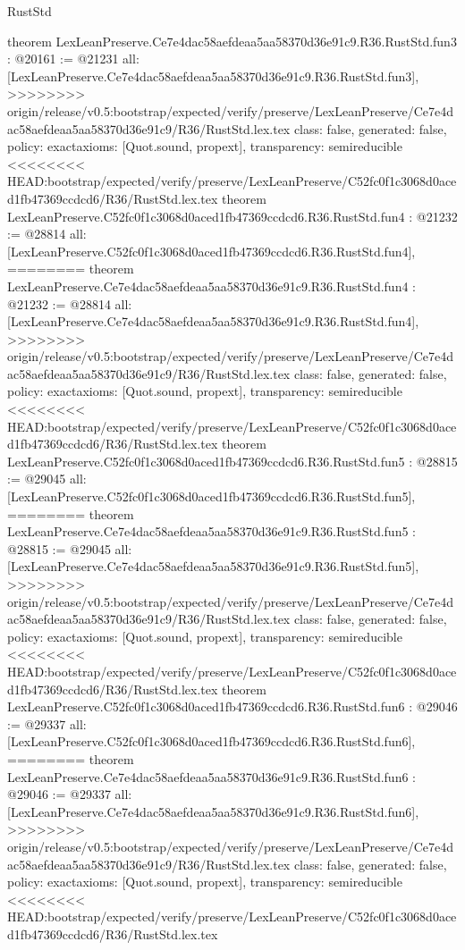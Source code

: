 \begin{lexlean}{RustStd}
\begin{coremodule}
{\begin{coremodule}
{{{{{{theorem LexLeanPreserve.Ce7e4dac58aefdeaa5aa58370d36e91c9.R36.RustStd.fun3 : @20161 := @21231 {
  all: [LexLeanPreserve.Ce7e4dac58aefdeaa5aa58370d36e91c9.R36.RustStd.fun3],
>>>>>>>> origin/release/v0.5:bootstrap/expected/verify/preserve/LexLeanPreserve/Ce7e4dac58aefdeaa5aa58370d36e91c9/R36/RustStd.lex.tex
  class: false,
  generated: false,
  policy: exact{axioms: [Quot.sound, propext]},
  transparency: semireducible
}
<<<<<<<< HEAD:bootstrap/expected/verify/preserve/LexLeanPreserve/C52fc0f1c3068d0aced1fb47369ccdcd6/R36/RustStd.lex.tex
theorem LexLeanPreserve.C52fc0f1c3068d0aced1fb47369ccdcd6.R36.RustStd.fun4 : @21232 := @28814 {
  all: [LexLeanPreserve.C52fc0f1c3068d0aced1fb47369ccdcd6.R36.RustStd.fun4],
========
theorem LexLeanPreserve.Ce7e4dac58aefdeaa5aa58370d36e91c9.R36.RustStd.fun4 : @21232 := @28814 {
  all: [LexLeanPreserve.Ce7e4dac58aefdeaa5aa58370d36e91c9.R36.RustStd.fun4],
>>>>>>>> origin/release/v0.5:bootstrap/expected/verify/preserve/LexLeanPreserve/Ce7e4dac58aefdeaa5aa58370d36e91c9/R36/RustStd.lex.tex
  class: false,
  generated: false,
  policy: exact{axioms: [Quot.sound, propext]},
  transparency: semireducible
}
<<<<<<<< HEAD:bootstrap/expected/verify/preserve/LexLeanPreserve/C52fc0f1c3068d0aced1fb47369ccdcd6/R36/RustStd.lex.tex
theorem LexLeanPreserve.C52fc0f1c3068d0aced1fb47369ccdcd6.R36.RustStd.fun5 : @28815 := @29045 {
  all: [LexLeanPreserve.C52fc0f1c3068d0aced1fb47369ccdcd6.R36.RustStd.fun5],
========
theorem LexLeanPreserve.Ce7e4dac58aefdeaa5aa58370d36e91c9.R36.RustStd.fun5 : @28815 := @29045 {
  all: [LexLeanPreserve.Ce7e4dac58aefdeaa5aa58370d36e91c9.R36.RustStd.fun5],
>>>>>>>> origin/release/v0.5:bootstrap/expected/verify/preserve/LexLeanPreserve/Ce7e4dac58aefdeaa5aa58370d36e91c9/R36/RustStd.lex.tex
  class: false,
  generated: false,
  policy: exact{axioms: [Quot.sound, propext]},
  transparency: semireducible
}
<<<<<<<< HEAD:bootstrap/expected/verify/preserve/LexLeanPreserve/C52fc0f1c3068d0aced1fb47369ccdcd6/R36/RustStd.lex.tex
theorem LexLeanPreserve.C52fc0f1c3068d0aced1fb47369ccdcd6.R36.RustStd.fun6 : @29046 := @29337 {
  all: [LexLeanPreserve.C52fc0f1c3068d0aced1fb47369ccdcd6.R36.RustStd.fun6],
========
theorem LexLeanPreserve.Ce7e4dac58aefdeaa5aa58370d36e91c9.R36.RustStd.fun6 : @29046 := @29337 {
  all: [LexLeanPreserve.Ce7e4dac58aefdeaa5aa58370d36e91c9.R36.RustStd.fun6],
>>>>>>>> origin/release/v0.5:bootstrap/expected/verify/preserve/LexLeanPreserve/Ce7e4dac58aefdeaa5aa58370d36e91c9/R36/RustStd.lex.tex
  class: false,
  generated: false,
  policy: exact{axioms: [Quot.sound, propext]},
  transparency: semireducible
}
<<<<<<<< HEAD:bootstrap/expected/verify/preserve/LexLeanPreserve/C52fc0f1c3068d0aced1fb47369ccdcd6/R36/RustStd.lex.tex
}}}}}}}}}
\end{coremodule}}
\end{coremodule}
\end{lexlean}
